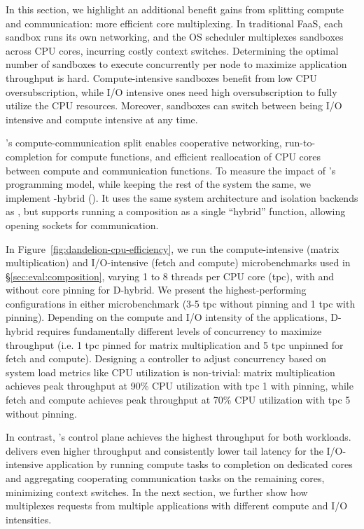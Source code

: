 In this section, we highlight an additional benefit \dandelion gains from splitting compute and communication: more efficient core multiplexing.
In traditional FaaS, each sandbox runs its own networking, and the OS scheduler multiplexes sandboxes across CPU cores, incurring costly context switches.
Determining the optimal number of sandboxes to execute concurrently per node to maximize application throughput is hard. 
Compute-intensive sandboxes benefit from low CPU oversubscription, while I/O intensive ones need high oversubscription to fully utilize the CPU resources. Moreover, sandboxes can switch between being I/O intensive and compute intensive at any time.

\dandelion's compute-communication split enables cooperative networking, run-to-completion for compute functions, and efficient reallocation of CPU cores between compute and communication functions. %
To measure the impact of \dandelion's programming model, while keeping the rest of the system the same, we implement \dandelion -hybrid (\hybrid). It uses the same system architecture and isolation backends as \dandelion, but supports running a composition as a single ``hybrid'' function, allowing opening sockets for communication.



In Figure~\ref{fig:dandelion-cpu-efficiency}, we run the compute-intensive (matrix multiplication) and I/O-intensive (fetch and compute) microbenchmarks used in \S\ref{sec:eval:composition}, varying 1 to 8 threads per CPU core (tpc), with and without core pinning for D-hybrid.
We present the highest-performing configurations in either microbenchmark (3-5 tpc without pinning and 1 tpc with pinning).
Depending on the compute and I/O intensity of the applications, D-hybrid requires fundamentally different levels of concurrency to maximize throughput (i.e. 1 tpc pinned for matrix multiplication and 5 tpc unpinned for fetch and compute).
Designing a controller to adjust concurrency based on system load metrics like CPU utilization is non-trivial: matrix multiplication achieves peak throughput at 90\% CPU utilization with tpc 1 with pinning, while fetch and compute achieves peak throughput at 70\% CPU utilization with tpc 5 without pinning.

In contrast, \dandelion's control plane achieves the highest
throughput for both workloads.
\dandelion delivers even higher throughput and consistently lower tail latency for the I/O-intensive application by running compute tasks to completion on dedicated cores and aggregating cooperating communication tasks on the remaining cores, minimizing context switches.
In the next section, we further show how \dandelion multiplexes requests from multiple applications with different compute and I/O intensities.


